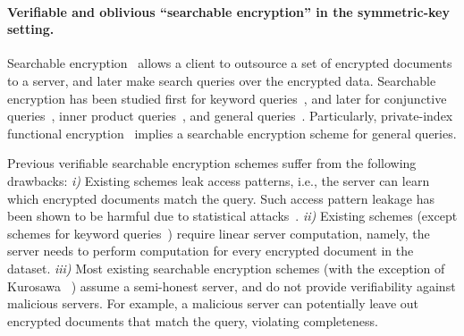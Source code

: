 \paragraph{Verifiable and oblivious ``searchable encryption'' in the symmetric-key setting.}
Searchable encryption~\cite{songsearch,DBLP:conf/ccs/CurtmolaGKO06,pkse,BW07,symenc,rangequery,GKPVZ12,DBLP:conf/eurocrypt/LewkoOSTW10,KSW08} allows a client
to outsource a set of encrypted documents to a server,
and later make search queries over the encrypted data.
Searchable encryption %
has been studied first for keyword queries~\cite{songsearch,DBLP:conf/ccs/CurtmolaGKO06,pkse,dynamicse},
and later for
conjunctive queries~\cite{BW07,rangequery},
inner product queries~\cite{KSW08,DBLP:conf/eurocrypt/LewkoOSTW10}, and general queries~\cite{GKPVZ12}.
Particularly, private-index
functional encryption~\cite{GKPVZ12} implies a searchable encryption
scheme for general queries.

Previous verifiable searchable encryption schemes
suffer from the following drawbacks:
{\it i)} Existing schemes leak access patterns,
i.e., the server can learn which encrypted documents
match the query. Such access pattern leakage has been shown to be
harmful due to statistical attacks~\cite{accesspatternleak}.
{\it ii)} Existing schemes (except schemes for keyword queries~\cite{DBLP:conf/ccs/CurtmolaGKO06,dynamicse})
require linear server computation, namely,
the server needs to perform computation
for every encrypted document in the dataset.
{\it iii)} 
Most existing searchable encryption schemes (with the exception of
Kurosawa \etal~\cite{DBLP:conf/fc/KurosawaO12})
assume a semi-honest server,
and do not
provide verifiability against malicious servers.
For example, a malicious server can potentially leave out
encrypted documents that match the query, violating completeness.


